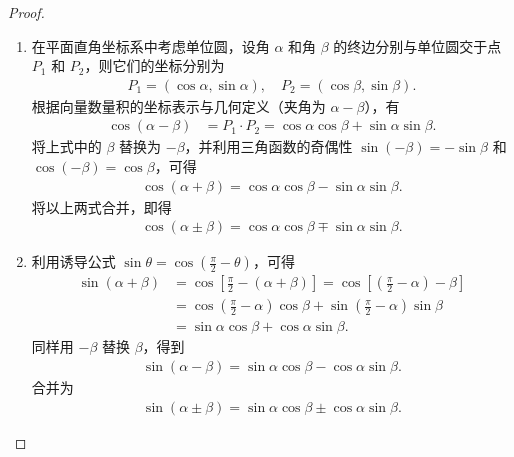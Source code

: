 \documentclass[../../main.tex]{subfiles}%
\begin{document}
\begin{proof}
\begin{enumerate}[(1)]
\item 在平面直角坐标系中考虑单位圆，设角 \(\alpha\) 和角 \(\beta\) 的终边分别与单位圆交于点 \(P_1\) 和 \(P_2\)，则它们的坐标分别为
\begin{align*}
P_1 = (\cos\alpha, \sin\alpha), \quad P_2 = (\cos\beta, \sin\beta).
\end{align*}
根据向量数量积的坐标表示与几何定义（夹角为 \(\alpha - \beta\)），有
\begin{align*}
\cos(\alpha - \beta) &= P_1 \cdot P_2 = \cos\alpha\cos\beta + \sin\alpha\sin\beta.
\end{align*}
将上式中的 \(\beta\) 替换为 \(-\beta\)，并利用三角函数的奇偶性 \(\sin(-\beta) = -\sin\beta\) 和 \(\cos(-\beta) = \cos\beta\)，可得
\begin{align*}
\cos(\alpha + \beta) = \cos\alpha\cos\beta - \sin\alpha\sin\beta.
\end{align*}
将以上两式合并，即得
\begin{align*}
\cos(\alpha \pm \beta) = \cos\alpha\cos\beta \mp \sin\alpha\sin\beta.
\end{align*}

\item 利用诱导公式 \(\sin\theta = \cos\left(\frac{\pi}{2} - \theta\right)\)，可得
\begin{align*}
\sin(\alpha + \beta) &= \cos\left[ \frac{\pi}{2} - (\alpha + \beta) \right] = \cos\left[ \left(\frac{\pi}{2} - \alpha\right) - \beta \right] \\
&= \cos\left(\frac{\pi}{2} - \alpha\right)\cos\beta + \sin\left(\frac{\pi}{2} - \alpha\right)\sin\beta \\
&= \sin\alpha\cos\beta + \cos\alpha\sin\beta.
\end{align*}
同样用 \(-\beta\) 替换 \(\beta\)，得到
\begin{align*}
\sin(\alpha - \beta) = \sin\alpha\cos\beta - \cos\alpha\sin\beta.
\end{align*}
合并为
\begin{align*}
\sin(\alpha \pm \beta) = \sin\alpha\cos\beta \pm \cos\alpha\sin\beta.
\end{align*}


\end{enumerate}
\end{proof}
\end{document}
